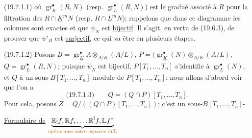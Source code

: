 (19.7.1.1)
où $\operatorname{gr}_{\underline K}^\bullet(R,N)$ 
(resp. $\operatorname{gr}_{\underline L}^\bullet(R,N)$) est le gradué associé à $R$
pour la filtration des $R\cap\underline K^mN$ (resp.  $R\cap\underline L^mN$);
rappelons que dans
ce diagramme les colonnes sont exactes et que $\psi_N$ est \uline{bijectif}. Il s'agit,
en vertu de (19.6.3), de prouver que $\psi'_R$ est \uline{surjectif}, ce qui
va être  en plusieurs étapes.

(19.7.1.2) Posons $B=\operatorname{gr}_{\underline K}^\bullet A\otimes_{A/\underline K}(A/\underline L)$,
$P=(\operatorname{gr}_{\underline K}^\bullet(N)\otimes_{A/\underline K}(A/\underline L)$,
$Q=\operatorname{gr}_{\underline L}^\bullet(R,N)$;
puisque $\psi_N$ est bijectif,  $P[T_1,\ldots,T_n]$ s'identifie à
$\operatorname{gr}_{\underline L}^\bullet(N)$, et
 $Q$ à un sous-$B[T_1,\ldots,T_n]$-module de $P[T_1,\ldots,T_n]$;
nous allons
d'abord voir que l'on a
\[
\text{(19.7.1.3)}\qquad Q=(Q\cap P)[T_1,\ldots,T_n].
\]
Pour cela, posons $Z=Q/((Q\cap P)[T_1,\ldots,T_n])$; c'est un sous-$B[T_1,\ldots,T_n]$-


\uline{Formulaire de}
$\underbrace{\mathbb{R}_!f,\mathbb{R}f_*,\ldots \mathbb{R}^!f,\mathbb{L}f^*}_{\text{\unsure{opérations entre espaces diff.}}}$

